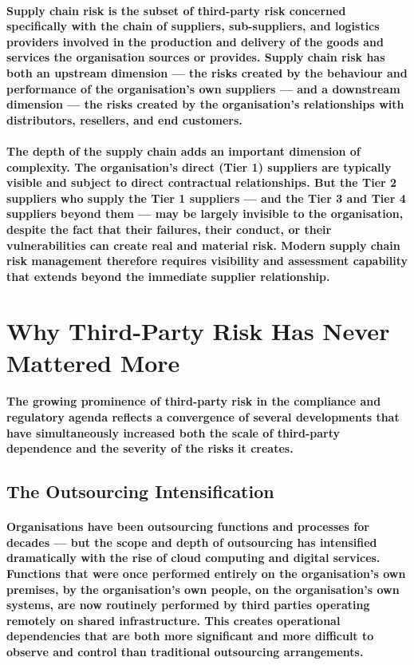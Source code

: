 \paragraph{\textbf{Supply chain risk} is the subset of third-party risk concerned specifically with the chain of suppliers, sub-suppliers, and logistics providers involved in the production and delivery of the goods and services the organisation sources or provides. Supply chain risk has both an upstream dimension — the risks created by the behaviour and performance of the organisation's own suppliers — and a downstream dimension — the risks created by the organisation's relationships with distributors, resellers, and end customers.}
\paragraph{The depth of the supply chain adds an important dimension of complexity. The organisation's direct (Tier 1) suppliers are typically visible and subject to direct contractual relationships. But the Tier 2 suppliers who supply the Tier 1 suppliers — and the Tier 3 and Tier 4 suppliers beyond them — may be largely invisible to the organisation, despite the fact that their failures, their conduct, or their vulnerabilities can create real and material risk. Modern supply chain risk management therefore requires visibility and assessment capability that extends beyond the immediate supplier relationship.}

\section{Why Third-Party Risk Has Never Mattered More}
\paragraph{The growing prominence of third-party risk in the compliance and regulatory agenda reflects a convergence of several developments that have simultaneously increased both the scale of third-party dependence and the severity of the risks it creates.}

\subsection{The Outsourcing Intensification}
\paragraph{Organisations have been outsourcing functions and processes for decades — but the scope and depth of outsourcing has intensified dramatically with the rise of cloud computing and digital services. Functions that were once performed entirely on the organisation's own premises, by the organisation's own people, on the organisation's own systems, are now routinely performed by third parties operating remotely on shared infrastructure. This creates operational dependencies that are both more significant and more difficult to observe and control than traditional outsourcing arrangements.}

